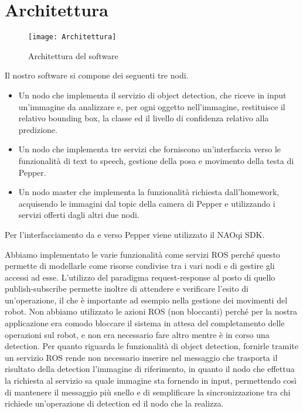 \section{Architettura}

\begin{figure}[ht]
	\centering
	\texttt{[image: Architettura]}
	\caption{Architettura del software}
	\label{fig:architecture}
\end{figure}

Il nostro software si compone dei seguenti tre nodi.
\begin{itemize}
    \item Un nodo che implementa il servizio di object detection, che riceve in input un’immagine da analizzare e, per ogni oggetto nell’immagine, restituisce il relativo bounding box, la classe ed il livello di confidenza relativo alla predizione.
    \item Un nodo che implementa tre servizi che forniscono un’interfaccia verso le funzionalità di text to speech, gestione della posa e movimento della testa di Pepper.
    \item Un nodo master che implementa la funzionalità richiesta dall’homework, acquisendo le immagini dal topic della camera di Pepper e utilizzando i servizi offerti dagli altri due nodi.
\end{itemize}
Per l’interfacciamento da e verso Pepper viene utilizzato il NAOqi SDK.

Abbiamo implementato le varie funzionalità come servizi ROS perché questo permette di modellarle come risorse condivise tra i vari nodi e di gestire gli accessi ad esse. L'utilizzo del paradigma request-response al posto di quello publish-subscribe permette inoltre di attendere e verificare l'esito di un'operazione, il che è importante ad esempio nella gestione dei movimenti del robot.
Non abbiamo utilizzato le azioni ROS (non bloccanti) perché per la nostra applicazione era comodo bloccare il sistema in attesa del completamento delle operazioni sul robot, e non era necessario fare altro mentre è in corso una detection.
Per quanto riguarda le funzionalità di object detection, fornirle tramite un servizio ROS rende non necessario inserire nel messaggio che trasporta il risultato della detection l'immagine di riferimento, in quanto il nodo che effettua la richiesta al servizio sa quale immagine sta fornendo in input, permettendo così di mantenere il messaggio più snello e di semplificare la sincronizzazione tra chi richiede un'operazione di detection ed il nodo che la realizza.

